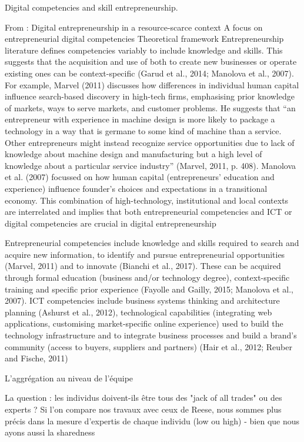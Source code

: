 \documentclass[12pt]{article}
\begin{document}
Digital competencies and skill entrepreneurship.

From : Digital entrepreneurship in a resource-scarce context A focus on entrepreneurial digital competencies
Theoretical framework Entrepreneurship literature defines competencies variably to include knowledge and skills. This suggests that the acquisition and use of both to create new businesses or operate existing ones can be context-specific (Garud et al., 2014; Manolova et al., 2007). For example, Marvel (2011) discusses how differences in individual human capital influence search-based discovery in high-tech firms, emphasising prior knowledge of markets, ways to serve markets, and customer problems. He suggests that “an entrepreneur with experience in machine design is more likely to package a technology in a way that is germane to some kind of machine than a service. Other entrepreneurs might instead recognize service opportunities due to lack of knowledge about machine design and manufacturing but a high level of knowledge about a particular service industry” (Marvel, 2011, p. 408). Manolova et al. (2007) focussed on how human capital (entrepreneurs’ education and experience) influence founder’s choices and expectations in a transitional economy. This combination of high-technology, institutional and local contexts are interrelated and implies that both entrepreneurial competencies and ICT or digital competencies are crucial in digital entrepreneurship

Entrepreneurial competencies include knowledge and skills required to search and acquire new information, to identify and pursue entrepreneurial opportunities (Marvel, 2011) and to innovate (Bianchi et al., 2017). These can be acquired through formal education (business and/or technology degree), context-specific training and specific prior experience (Fayolle and Gailly, 2015; Manolova et al., 2007). ICT competencies include business systems thinking and architecture planning (Ashurst et al., 2012), technological capabilities (integrating web applications, customising market-specific online experience) used to build the technology infrastructure and to integrate business processes and build a brand’s community (access to buyers, suppliers and partners) (Hair et al., 2012; Reuber and Fische, 2011)

L'aggrégation au niveau de l'équipe

La question : les individus doivent-ils être tous des "jack of all trades" ou des experts ?
Si l'on compare nos travaux avec ceux de Reese, nous sommes plus précis dans la mesure d'expertis de chaque individu (low ou high) - bien que nous ayons aussi la sharedness
\end{document}

